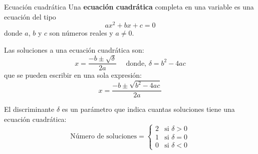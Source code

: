 \begin{infocard}{Ecuación cuadrática}
    Una \textbf{ecuación cuadrática} completa en una variable es una ecuación del tipo
    \begin{equation}
        ax^2 + bx + c = 0
    \end{equation}
    donde $a$, $b$ y $c$ son números reales y $a\neq0$.

    Las soluciones a una ecuación cuadrática son:
    \[
        x = \frac{-b\pm \sqrt{\delta}}{2a} \quad \text{ donde, }\delta=b^2-4ac
    \]
    que se pueden escribir en una sola expresión:
    \[x= \dfrac{-b\pm\sqrt{b^2-4ac}}{2a}\]

    El discriminante $\delta$ es un parámetro que indica cuantas soluciones tiene una ecuación cuadrática:
    \[\text{Número de soluciones}=
        \begin{cases}
            2 & \text{si } \delta > 0 \\
            1 & \text{si } \delta = 0 \\
            0 & \text{si } \delta < 0
        \end{cases}
    \]
\end{infocard}